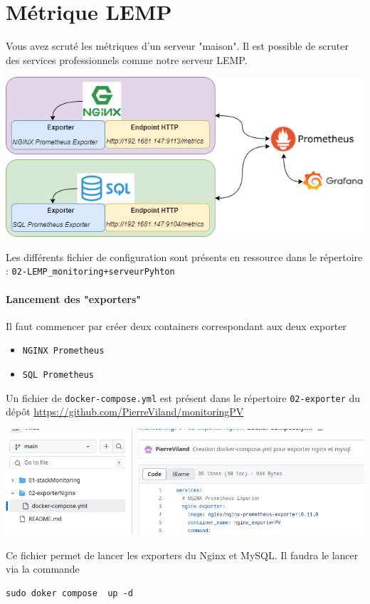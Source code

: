 \documentclass[french, 12pt]{article}%
\newcommand{\itemE}{\item[$\bullet$]}
\begin{document}
 
 
\section{Métrique LEMP}
Vous avez scruté les métriques d'un serveur "maison".  Il est possible de scruter des services professionnels comme notre serveur LEMP. 


\begin{center}
\includegraphics[scale=0.7]{./ressource/schemaPrometheus-LEMP_Prometheuse.drawio.png}
\end{center}

Les différents fichier de configuration sont présents en ressource dans le répertoire : \verb?02-LEMP_monitoring+serveurPyhton?


\paragraph{Lancement des "exporters"}
Il faut commencer par créer deux containers correspondant aux deux exporter
\begin{itemize}
\itemE \verb?NGINX Prometheus?
\itemE \verb?SQL Prometheus?
\end{itemize}


Un fichier de \verb?docker-compose.yml? est présent dans le répertoire \verb?02-exporter? du dépôt
\url{https://github.com/PierreViland/monitoringPV}
\begin{center}
\includegraphics[scale=0.4]{./ressource/visuDockerExporter}
\end{center}
Ce fichier permet de lancer les exporters du Nginx et MySQL. Il faudra le lancer via la commande
\begin{lstlisting}[style=commande]
sudo doker compose  up -d
\end{lstlisting}
\end{document}
